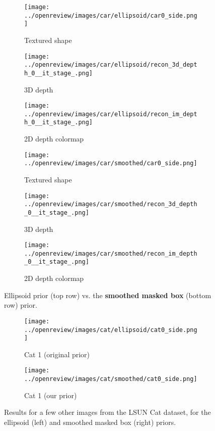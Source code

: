 \begin{figure}[!htb]
    \centering
    \begin{subfigure}[t]{0.28\textwidth}
        \centering
        \texttt{[image: ../openreview/images/car/ellipsoid/car0\_side.png]}
        \caption{Textured shape}
        
    \end{subfigure}
    \begin{subfigure}[t]{0.28\textwidth}
        \centering
        \texttt{[image: ../openreview/images/car/ellipsoid/recon\_3d\_depth\_0\_\_it\_stage\_.png]}
        \caption{3D depth}
        
    \end{subfigure}
    \begin{subfigure}[t]{0.28\textwidth}
        \centering
        \texttt{[image: ../openreview/images/car/ellipsoid/recon\_im\_depth\_0\_\_it\_stage\_.png]}
        \caption{2D depth colormap}
        
    \end{subfigure}
    \begin{subfigure}[t]{0.28\textwidth}
        \centering
        \texttt{[image: ../openreview/images/car/smoothed/car0\_side.png]}
        \caption{Textured shape}
        
    \end{subfigure}
    \begin{subfigure}[t]{0.28\textwidth}
        \centering
        \texttt{[image: ../openreview/images/car/smoothed/recon\_3d\_depth\_0\_\_it\_stage\_.png]}
        \caption{3D depth}
        
    \end{subfigure}
    \begin{subfigure}[t]{0.28\textwidth}
        \centering
        \texttt{[image: ../openreview/images/car/smoothed/recon\_im\_depth\_0\_\_it\_stage\_.png]}
        \caption{2D depth colormap}
        
    \end{subfigure}
    \caption{Ellipsoid prior (top row) vs. the \textbf{smoothed masked box} (bottom row) prior.}
    \label{fig:3d_depth_diff_priors}
\end{figure}
\begin{figure}[!htb]
    \centering
    \begin{subfigure}{0.4\textwidth}
        \centering
        \texttt{[image: ../openreview/images/cat/ellipsoid/cat0\_side.png]}
        \caption{Cat 1 (original prior)}
    \end{subfigure}
    \begin{subfigure}{0.4\textwidth}
        \centering
        \texttt{[image: ../openreview/images/cat/smoothed/cat0\_side.png]}
        \caption{Cat 1 (our prior)}
    \end{subfigure}
    \caption{Results for a few other images from the LSUN Cat dataset, for the ellipsoid (left) and smoothed masked box (right) priors.}
    \label{fig:appendix-ellips_vs_box}
\end{figure}
